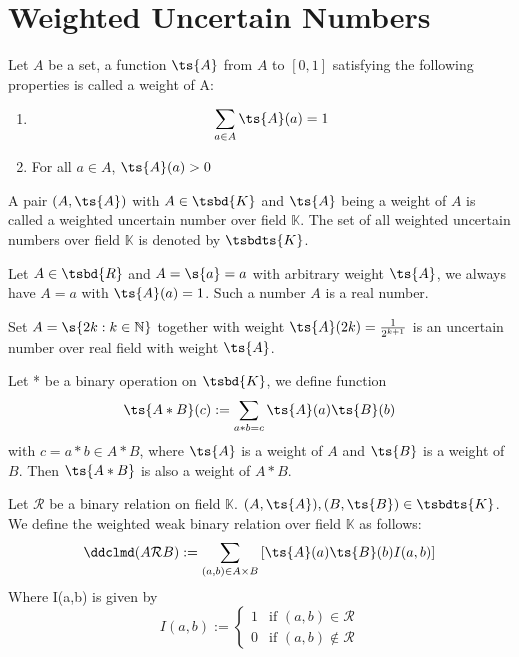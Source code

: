 \section{Weighted Uncertain Numbers}
\begin{definition}[Weight]
	Let $A$ be a set, a function $\ts{A}$ from $A$ to $[0,1]$ satisfying the following properties is called a weight of A: 
	\begin{enumerate}
		\item $$\sum_{a \in A}{\ts{A}(a) } = 1$$
		\item For all $a \in A$, $\ts{A}(a) > 0 $
	\end{enumerate}
\end{definition}
\begin{definition}
	A pair $(A,\ts{A})$ with $A \in \tsbd{K}$ and $\ts{A}$ being a weight of $A$ is called a weighted uncertain number over field $\mathbb{K}$. The set of all weighted uncertain numbers over field $\mathbb{K}$ is denoted by $\tsbdts{K}$.
\end{definition}
\begin{example}
	Let $A \in \tsbd{R}$ and $A = \s{a} = a $ with arbitrary weight $\ts{A}$, we always have $A = a$ with $\ts{A}(a) =1$. Such a number $A$ is a real number.
\end{example}
\begin{example}
	Set $A=\s{2k : k \in \mathbb{N}}$ together with weight $\ts{A}(2k) = \frac{1}{2^{k+1}}$ is an uncertain number over real field with weight $\ts{A}$.
\end{example}
\begin{theorem}
	Let * be a binary operation on $\tsbd{K}$, we define function $$\ts{A*B}(c) := \sum_{a*b=c}{\ts{A}(a)\ts{B}(b)}$$ with $c = a * b \in A * B $, where $\ts{A}$ is a weight of $A$ and $\ts{B}$ is a weight of $B$. Then $\ts{A*B}$ is also a weight of $A *B $.
\end{theorem}
\begin{definition}
	Let $\mathcal{R}$ be a binary relation on field $\mathbb{K}$. $(A,\ts{A}),(B,\ts{B}) \in \tsbdts{K}$. We define the weighted weak binary relation over field $\mathbb{K}$ as follows:
	\[\ddclmd(A\mathcal{R}B) := \sum_{(a,b) \in A \times B}{\left[\ts{A}(a)\ts{B}(b)I(a,b)\right]}\]
	Where I(a,b) is given by \[
	I(a,b) := \begin{cases}
		1 & \text{if } (a,b) \in \mathcal{R} \\
		0 & \text{if } (a,b) \notin \mathcal{R}
	\end{cases}
	\]
\end{definition}